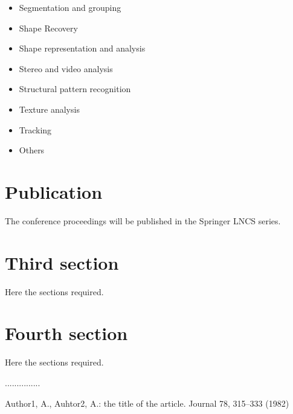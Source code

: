 \documentclass{llncs}
\begin{document}
\begin{itemize}
\item Segmentation and grouping

\item Shape Recovery

\item Shape representation and analysis

\item Stereo and video analysis

\item Structural pattern recognition

\item Texture analysis

\item Tracking

\item Others


\end{itemize}

\section{Publication}
The conference proceedings will be published in the  Springer LNCS  series.

\section{Third section}
Here the sections required.


\section{Fourth section}
Here the sections required.

...............
%
\begin{thebibliography}{}
%
Author1, A., Auhtor2, A.:
the title of the article.
Journal 78, 315--333 (1982)

\end{thebibliography}
\end{document}
